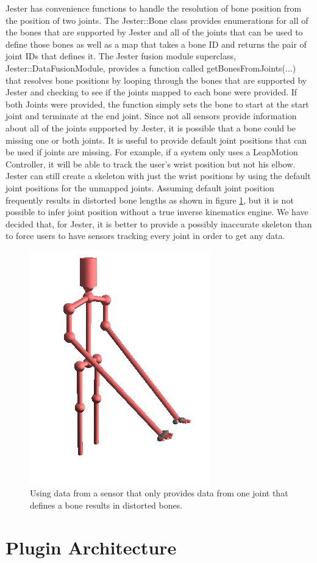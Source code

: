 Jester has convenience functions to handle the resolution of bone position from the position of two joints. The Jester::Bone class provides enumerations for all of the bones that are supported by Jester and all of the joints that can be used to define those bones as well as a map that takes a bone ID and returns the pair of joint IDs that defines it. The Jester fusion module superclass, Jester::DataFusionModule, provides a function called getBonesFromJoints(...) that resolves bone positions by looping through the bones that are supported by Jester and checking to see if the joints mapped to each bone were provided. If both Joints were provided, the function simply sets the bone to start at the start joint and terminate at the end joint. Since not all sensors provide information about all of the joints supported by Jester, it is possible that a bone could be missing one or both joints. It is useful to provide default joint positions that can be used if joints are missing. For example, if a system only uses a LeapMotion Controller, it will be able to track the user’s wrist position but not his elbow. Jester can still create a skeleton with just the wrist positions by using the default joint positions for the unmapped joints. Assuming default joint position frequently results in distorted bone lengths as shown in figure \ref{fig:distorted_bones}, but it is not possible to infer joint position without a true inverse kinematics engine. We have decided that, for Jester, it is better to provide a possibly inaccurate skeleton than to force users to have sensors tracking every joint in order to get any data.

\begin{figure}[]
\centering
\includegraphics[width=.3\textwidth]{figures/distortedBones}
\caption{Using data from a sensor that only provides data from one joint that defines a bone results in distorted bones.}
\label{fig:distorted_bones}
\end{figure}

\section{Plugin Architecture}

